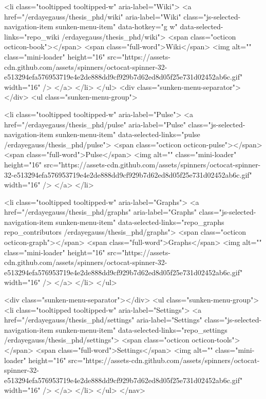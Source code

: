       <li class="tooltipped tooltipped-w" aria-label="Wiki">
        <a href="/erdayegauss/thesis_phd/wiki" aria-label="Wiki" class="js-selected-navigation-item sunken-menu-item" data-hotkey="g w" data-selected-links="repo_wiki /erdayegauss/thesis_phd/wiki">
          <span class="octicon octicon-book"></span> <span class="full-word">Wiki</span>
          <img alt="" class="mini-loader" height="16" src="https://assets-cdn.github.com/assets/spinners/octocat-spinner-32-e513294efa576953719e4e2de888dd9cf929b7d62ed8d05f25e731d02452ab6c.gif" width="16" />
</a>      </li>
  </ul>
  <div class="sunken-menu-separator"></div>
  <ul class="sunken-menu-group">

    <li class="tooltipped tooltipped-w" aria-label="Pulse">
      <a href="/erdayegauss/thesis_phd/pulse" aria-label="Pulse" class="js-selected-navigation-item sunken-menu-item" data-selected-links="pulse /erdayegauss/thesis_phd/pulse">
        <span class="octicon octicon-pulse"></span> <span class="full-word">Pulse</span>
        <img alt="" class="mini-loader" height="16" src="https://assets-cdn.github.com/assets/spinners/octocat-spinner-32-e513294efa576953719e4e2de888dd9cf929b7d62ed8d05f25e731d02452ab6c.gif" width="16" />
</a>    </li>

    <li class="tooltipped tooltipped-w" aria-label="Graphs">
      <a href="/erdayegauss/thesis_phd/graphs" aria-label="Graphs" class="js-selected-navigation-item sunken-menu-item" data-selected-links="repo_graphs repo_contributors /erdayegauss/thesis_phd/graphs">
        <span class="octicon octicon-graph"></span> <span class="full-word">Graphs</span>
        <img alt="" class="mini-loader" height="16" src="https://assets-cdn.github.com/assets/spinners/octocat-spinner-32-e513294efa576953719e4e2de888dd9cf929b7d62ed8d05f25e731d02452ab6c.gif" width="16" />
</a>    </li>
  </ul>


    <div class="sunken-menu-separator"></div>
    <ul class="sunken-menu-group">
      <li class="tooltipped tooltipped-w" aria-label="Settings">
        <a href="/erdayegauss/thesis_phd/settings" aria-label="Settings" class="js-selected-navigation-item sunken-menu-item" data-selected-links="repo_settings /erdayegauss/thesis_phd/settings">
          <span class="octicon octicon-tools"></span> <span class="full-word">Settings</span>
          <img alt="" class="mini-loader" height="16" src="https://assets-cdn.github.com/assets/spinners/octocat-spinner-32-e513294efa576953719e4e2de888dd9cf929b7d62ed8d05f25e731d02452ab6c.gif" width="16" />
</a>      </li>
    </ul>
</nav>

